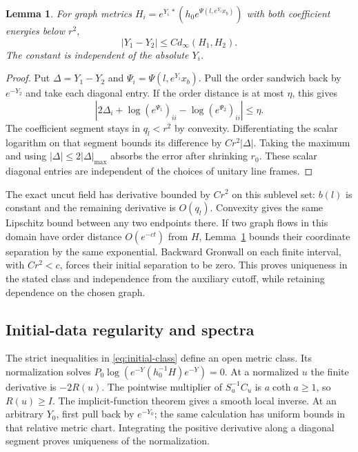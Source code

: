 \documentclass[11pt]{amsart}
\newtheorem{lemma}[theorem]{Lemma}
\theoremstyle{definition}
\theoremstyle{remark}
\begin{document}
\begin{lemma}\label{lem:inverse-metric}
For graph metrics $H_i=e^{Y_i\,*}(h_0e^{\Psi(l,e^{Y_i}x_b)})$
with both coefficient energies below $r^2$,
\begin{equation}\label{eq:inverse-metric}
 |Y_1-Y_2|\le C d_\infty(H_1,H_2).
\end{equation}
The constant is independent of the absolute $Y_i$.
\end{lemma}
\begin{proof}
Put $\Delta=Y_1-Y_2$ and $\Psi_i=\Psi(l,e^{Y_i}x_b)$.
Pull the order sandwich back by $e^{-Y_2}$ and take each
diagonal entry. If the order distance is at most $\eta$, this gives
\[
 |2\Delta_i+\log(e^{\Psi_1})_{ii}
                       -\log(e^{\Psi_2})_{ii}|\le\eta .
\]
The coefficient segment stays in $q_l<r^2$ by convexity.
Differentiating the scalar logarithm on that segment bounds
its difference by $Cr^2|\Delta|$. Taking the maximum and
using $|\Delta|\le2|\Delta|_{\max}$ absorbs the error after
shrinking $r_0$. These scalar diagonal entries are independent
of the choices of unitary line frames.
\end{proof}

The exact uncut field has derivative bounded by $Cr^2$
on this sublevel set: $b(l)$ is constant and the remaining
derivative is $O(q_l)$. Convexity gives the same Lipschitz
bound between any two endpoints there. If two graph flows
in this domain have order distance $O(e^{-ct})$ from $H$,
Lemma~\ref{lem:inverse-metric} bounds their coordinate
separation by the same exponential. Backward Gronwall on
each finite interval, with $Cr^2<c$, forces their initial
separation to be zero. This proves uniqueness in the stated
class and independence from the auxiliary cutoff, while
retaining dependence on the chosen graph.

\subsection{Initial-data regularity and spectra}
The strict inequalities in \eqref{eq:initial-class} define
an open metric class. Its normalization solves
$P_0\log(e^{-Y}(h_0^{-1}H)e^{-Y})=0$.
At a normalized $u$ the finite derivative is $-2R(u)$.
The pointwise multiplier of $S_u^{-1}C_u$ is
$a\coth a\ge1$, so $R(u)\ge I$. The implicit-function
theorem gives a smooth local inverse. At an arbitrary
$Y_0$, first pull back by $e^{-Y_0}$; the same calculation
has uniform bounds in that relative metric chart.
Integrating the positive derivative along a diagonal
segment proves uniqueness of the normalization.
\end{document}
